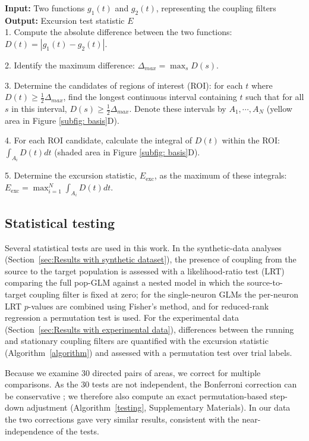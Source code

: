 \documentclass[12pt]{article}
\begin{document}
\begin{algorithm}
\caption{Excursion algorithm}
\label{algorithm}
\textbf{Input:} Two functions $ g_1(t) $ and $ g_2(t)$, representing the coupling filters \\
\textbf{Output:} Excursion test statistic $E$ \\
1. Compute the absolute difference between the two functions: $D(t)=\left| g_1(t)-g_2(t) \right|$.

2. Identify the maximum difference: $\Delta_{max}=\max_s D(s)$.

3. Determine the candidates of regions of interest (ROI): for each $t$ where $D(t) \geq \frac{1}{2} \Delta_{max}$, find the longest continuous interval containing $t$ such that for all $s$ in this interval, $D(s) \geq \frac{1}{2} \Delta_{max}$. Denote these intervals by $A_1, \cdots, A_N$ (yellow area in Figure \ref{subfig: basis}D).

4. For each ROI candidate, calculate the integral of $D(t)$ within the ROI: $\int_{A_i} D(t)dt$ (shaded area in Figure \ref{subfig: basis}D).

5. Determine the excursion statistic, $E_{\text{exc}}$, as the maximum of these integrals: $E_{\text{exc}} = \max_{i=1}^N \int_{A_i} D(t)dt$.
 
\end{algorithm}




\subsection{Statistical testing}
\label{sec:statistical testing}

Several statistical tests are used in this work. In the synthetic-data analyses (Section~\ref{sec:Results with synthetic dataset}), the presence of coupling from the source to the target population is assessed with a likelihood-ratio test (LRT) comparing the full pop-GLM against a nested model in which the source-to-target coupling filter is fixed at zero; for the single-neuron GLMs the per-neuron LRT $p$-values are combined using Fisher's method, and for reduced-rank regression a permutation test is used. For the experimental data (Section~\ref{sec:Results with experimental data}), differences between the running and stationary coupling filters are quantified with the excursion statistic (Algorithm~\ref{algorithm}) and assessed with a permutation test over trial labels.

Because we examine 30 directed pairs of areas, we correct for multiple comparisons. As the 30 tests are not independent, the Bonferroni correction can be conservative \cite{proschan2011asymptotics}; we therefore also compute an exact permutation-based step-down adjustment (Algorithm~\ref{testing}, Supplementary Materials). In our data the two corrections gave very similar results, consistent with the near-independence of the tests.
\end{document}
